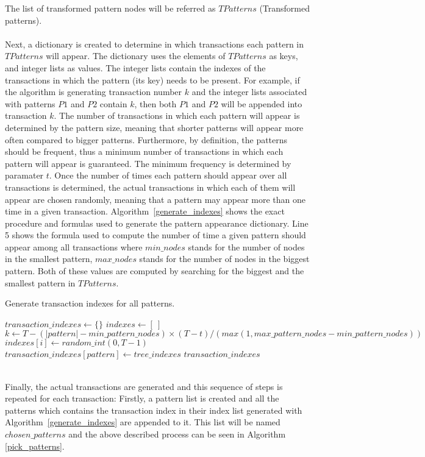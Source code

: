 \documentclass{acm_proc_article-sp-sigmod09}
\begin{document}
The list of transformed pattern nodes will be referred as $TPatterns$ (Transformed patterns).
\\\\
Next, a dictionary is created to determine in which transactions each pattern in $TPatterns$ will appear. The dictionary uses the elements of $TPatterns$ as keys, and integer lists as values. The integer lists contain the indexes of the transactions in which the pattern (its key) needs to be present. For example, if the algorithm is generating transaction number $k$ and the integer lists associated with patterns $P1$ and $P2$ contain $k$, then both $P1$ and $P2$ will be appended into transaction $k$. The number of transactions in which each pattern will appear is determined by the pattern size, meaning that shorter patterns will appear more often compared to bigger patterns. Furthermore, by definition, the patterns should be frequent, thus a minimum number of transactions in which each pattern will appear is guaranteed. The minimum frequency is determined by paramater $t$. Once the number of times each pattern should appear over all transactions is determined, the actual transactions in which each of them will appear are chosen randomly, meaning that a pattern may appear more than one time in a given transaction. Algorithm~\ref{generate_indexes} shows the exact procedure and formulas used to generate the pattern appearance dictionary. Line 5 shows the formula used to compute the number of time a given pattern should appear among all transactions where $min\_nodes$ stands for the number of nodes in the smallest pattern, $max\_nodes$ stands for the number of nodes in the biggest pattern. Both of these values are computed by searching for the biggest and the smallest pattern in $TPatterns$.
\begin{algorithm}
\caption{Generate transaction indexes for all patterns.}
\label{generate_indexes}
\begin{algorithmic}[1]
\State $transaction\_indexes \gets \{\}$
	\State $indexes \gets [\:]$
	\State $k \gets T - (|pattern| - min\_pattern\_nodes) \times (T - t) / (max(1, max\_pattern\_nodes - min\_pattern\_nodes))$
	\State $indexes[i] \gets random\_int(0, T - 1)$
	\EndFor
	\State $transaction\_indexes[pattern] \gets tree\_indexes$
\EndFor
\Return $transaction\_indexes$
\EndFunction
\end{algorithmic}
\end{algorithm}
\\
Finally, the actual transactions are generated and this sequence of steps is repeated for each transaction: Firstly, a pattern list is created and all the patterns which contains the transaction index in their index list generated with Algorithm~\ref{generate_indexes} are appended to it. This list will be named $chosen\_patterns$ and the above described process can be seen in Algorithm \ref{pick_patterns}.
\end{document}
